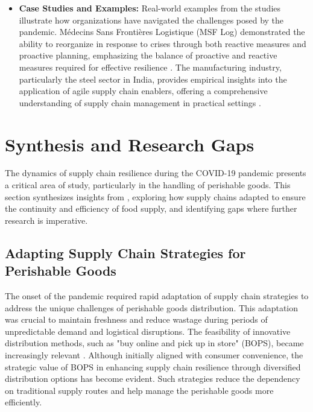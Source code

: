 \begin{itemize}
    \item \textbf{Case Studies and Examples: }Real-world examples from the studies illustrate how organizations have navigated the challenges posed by the pandemic. Médecins Sans Frontières Logistique (MSF Log) demonstrated the ability to reorganize in response to crises through both reactive measures and proactive planning, emphasizing the balance of proactive and reactive measures required for effective resilience \parencite{Michel2023DimensionsPandemic}. The manufacturing industry, particularly the steel sector in India, provides empirical insights into the application of agile supply chain enablers, offering a comprehensive understanding of supply chain management in practical settings \parencite{Mishra2024RedefiningFactors}.

\end{itemize}


\section{Synthesis and Research Gaps}

The dynamics of supply chain resilience during the COVID-19 pandemic presents a critical area of study, particularly in the handling of perishable goods. This section synthesizes insights from \textcite{Li2010TheValue, RiveroGutierrez2020OmnichannelSector, Zhang2020IntegrationBOPS}, exploring how supply chains adapted to ensure the continuity and efficiency of food supply, and identifying gaps where further research is imperative.

\subsection{Adapting Supply Chain Strategies for Perishable Goods}

The onset of the pandemic required rapid adaptation of supply chain strategies to address the unique challenges of perishable goods distribution. This adaptation was crucial to maintain freshness and reduce wastage during periods of unpredictable demand and logistical disruptions. The feasibility of innovative distribution methods, such as "buy online and pick up in store" (BOPS), became increasingly relevant \parencite{Zhang2020IntegrationBOPS}. Although initially aligned with consumer convenience, the strategic value of BOPS in enhancing supply chain resilience through diversified distribution options has become evident. Such strategies reduce the dependency on traditional supply routes and help manage the perishable goods more efficiently.


